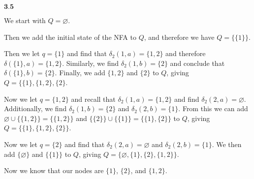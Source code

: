 \documentclass{article}
\newcommand{\problem}[1]{$\boxed{\textbf{#1}}$}
\begin{document}
\begin{minipage}{\textwidth}
\problem{3.5}

We start with $Q=\varnothing$.

Then we add the initial state of the NFA to $Q$, and therefore we have
$Q=\{\{1\}\}$.

Then we let $q=\{1\}$ and find that $\delta_2(1,a)=\{1,2\}$ and
therefore $\delta(\{1\},a)=\{1,2\}$. Similarly, we find
$\delta_2(1,b)=\{2\}$ and conclude that
$\delta(\{1\},b)=\{2\}$. Finally, we add $\{1,2\}$ and $\{2\}$ to $Q$,
giving $Q=\{\{1\},\{1,2\},\{2\}$.

Now we let $q=\{1,2\}$ and recall that $\delta_2(1,a)=\{1,2\}$ and
find $\delta_2(2,a)=\varnothing$. Additionally, we find
$\delta_2(1,b)=\{2\}$ and $\delta_2(2,b)=\{1\}$. From this we can add
$\varnothing\cup\{\{1,2\}\}=\{\{1,2\}\}$ and
$\{\{2\}\}\cup\{\{1\}\}=\{\{1\},\{2\}\}$ to $Q$, giving
$Q=\{\{1\},\{1,2\},\{2\}\}$.

Now we let $q=\{2\}$ and find that $\delta_2(2,a)=\varnothing$ and
$\delta_2(2,b)=\{1\}$. We then add $\{\varnothing\}$ and $\{\{1\}\}$
to $Q$, giving $Q=\{\varnothing,\{1\},\{2\},\{1,2\}\}$.

Now we know that our nodes are $\{1\}$, $\{2\}$, and $\{1,2\}$.

%
%
\end{minipage}
\end{document}
